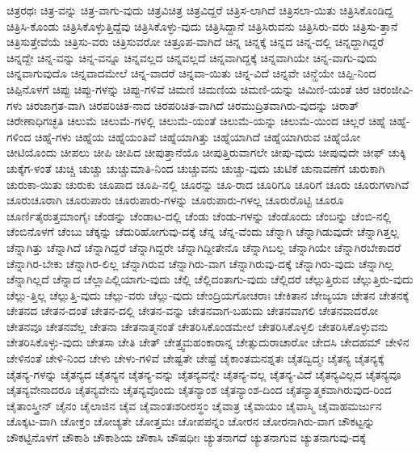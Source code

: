 {ಚಿತ್ರರಥಃ
ಚಿತ್ರ-ವನ್ನು
ಚಿತ್ರ-ವಾಗು-ವುದು
ಚಿತ್ರವಿಚಿತ್ರ
ಚಿತ್ರವಿದ್ದರೆ
ಚಿತ್ರಿಸ-ಲಾಗಿದೆ
ಚಿತ್ರಿಸಲಾ-ಯಿತು
ಚಿತ್ರಿಸಿಕೊಂಡಿದ್ದ
ಚಿತ್ರಿಸಿ-ಕೊಂಡು
ಚಿತ್ರಿಸಿಕೊಳ್ಳುತ್ತಿದ್ದೆವು
ಚಿತ್ರಿಸಿಕೊಳ್ಳು-ವುದು
ಚಿತ್ರಿಸಿದ್ದಾನೆ
ಚಿತ್ರಿಸಿರುವನು
ಚಿತ್ರಿಸಿರು-ವರು
ಚಿತ್ರಿಸು-ತ್ತಾನೆ
ಚಿತ್ರಿಸುತ್ತೇವೆಯೆ
ಚಿತ್ರಿಸು-ವರು
ಚಿತ್ರಿಸುವರೋ
ಚಿತ್ರೂಪ-ವಾಗಿದೆ
ಚಿನ್ನ
ಚಿನ್ನಕ್ಕೆ
ಚಿನ್ನದ
ಚಿನ್ನ-ದಲ್ಲಿ
ಚಿನ್ನದ್ದಾಗಿದ್ದರೆ
ಚಿನ್ನದ್ದೇ
ಚಿನ್ನ-ವನ್ನು
ಚಿನ್ನ-ವನ್ನೂ
ಚಿನ್ನವಲ್ಲದ
ಚಿನ್ನವಲ್ಲದೆ
ಚಿನ್ನವಾಗಿದ್ದಕ್ಕೆ
ಚಿನ್ನವಾಗಿಯೇ
ಚಿನ್ನ-ವಾಗು-ವುದು
ಚಿನ್ನವಾಗುವುದೊ
ಚಿನ್ನವಾದಮೇಲೆ
ಚಿನ್ನ-ವಾದರೆ
ಚಿನ್ನವಾ-ಯಿತು
ಚಿನ್ನ-ವಿದೆ
ಚಿನ್ನವೇ
ಚಿನ್ಹೆಯೇ
ಚಿಪ್ಪಿ-ನಿಂದ
ಚಿಪ್ಪಿನೊಳಗೆ
ಚಿಪ್ಪು
ಚಿಪ್ಪು-ಗಳನ್ನು
ಚಿಪ್ಪು-ಗಳಿವೆ
ಚಿಮಣಿ
ಚಿಮಣಿಯ
ಚಿಮಣಿ-ಯನ್ನು
ಚಿಮಿಣಿ-ಯಂತೆ
ಚಿರ
ಚಿರಂಜೀವಿ-ಗಳು
ಚಿರಜಾಗ್ರತ-ವಾಗಿ
ಚಿರಪರಿಚಿತ-ನಾದ
ಚಿರಪರಿಚಿತ-ವಾಗಿದೆ
ಚಿರಮುದ್ರಿತವಾಗಿರು-ವುದನ್ನು
ಚಿರಾತ್
ಚಿರೇಣಾಧಿಗಚ್ಛತಿ
ಚಿಲುಮೆ
ಚಿಲುಮೆ-ಗಳಲ್ಲಿ
ಚಿಲುಮೆ-ಯಂತೆ
ಚಿಲುಮೆ-ಯನ್ನು
ಚಿಲುಮೆ-ಯಿಂದ
ಚಿಲ್ಲರೆ
ಚಿಹ್ನೆ
ಚಿಹ್ನೆ-ಗಳಿಂದ
ಚಿಹ್ನೆ-ಗಳು
ಚಿಹ್ನೆಯ
ಚಿಹ್ನೆಯಂತಿವೆ
ಚಿಹ್ನೆಯಾಗಿತ್ತು
ಚಿಹ್ನೆಯಾಗಿದೆ
ಚಿಹ್ನೆಯಾಗಿರುವ
ಚಿಹ್ನೆಯೋ
ಚೀಟಿಯೊಂದು
ಚೀಪಲು
ಚೀಪಿ
ಚೀಪಿದ
ಚೀಪುತ್ತಾನೆಯೊ
ಚೀಪುತ್ತಿರುವಾಗಲೇ
ಚೀಪು-ವುದು
ಚೀಪುವುದೇ
ಚೀಫ್
ಚುಕ್ಕಿ
ಚುಕ್ಕೆಗ-ಳಂತೆ
ಚುಚ್ಚಿ
ಚುಚ್ಚು
ಚುಚ್ಚುಮಾತಿ-ನಿಂದ
ಚುಚ್ಚುವನು
ಚುಚ್ಚು-ವುದು
ಚುಟಿಕೆ
ಚುನಾವಣೆಗೆ
ಚುರುಕಾಗಿ
ಚುರುಕಾ-ಯಿತು
ಚುರುಕು
ಚೂಪಾದ
ಚೂಪಿ-ನಲ್ಲಿ
ಚೂರನ್ನು
ಚೂ-ರಾದ
ಚೂರಿಗೂ
ಚೂರಿಗೆ
ಚೂರು
ಚೂರುಗಳಾಗಿವೆ
ಚೂರುಚೂರಾಗಿ
ಚೂರುಪಾರು
ಚೂರುಪಾರು-ಗಳನ್ನು
ಚೂರುಪಾರು-ಗಳಲ್ಲ
ಚೂರುರೊಟ್ಟಿ
ಚೂರೂ
ಚೂರ್ಣಿತೈರುತ್ತಮಾಂಗೈಃ
ಚೆಂಡನ್ನು
ಚೆಂಡಾಟ-ದಲ್ಲಿ
ಚೆಂಡು
ಚೆಂಡು-ಗಳನ್ನು
ಚೆಂಡೊಂದು
ಚೆಂಬನ್ನು
ಚೆಂಬಿ-ನಲ್ಲಿ
ಚೆಂಬಿನೊಳಗೆ
ಚೆಂಬು
ಚೆಕ್ಕನ್ನು
ಚೆದುರಿಹೋಗುವು-ದಕ್ಕೆ
ಚೆನ್ನ
ಚೆನ್ನ-ವೆಂದು
ಚೆನ್ನಾಗಿ
ಚೆನ್ನಾಗಿಡುವುದೇ
ಚೆನ್ನಾಗಿತ್ತಲ್ಲ
ಚೆನ್ನಾಗಿತ್ತು
ಚೆನ್ನಾಗಿದೆ
ಚೆನ್ನಾಗಿದ್ದರೆ
ಚೆನ್ನಾಗಿದ್ದರೇ
ಚೆನ್ನಾಗಿದ್ದೀತೇನೊ
ಚೆನ್ನಾಗಿಬಲ್ಲ
ಚೆನ್ನಾಗಿಯೇ
ಚೆನ್ನಾಗಿರಬೇಕಾದರೆ
ಚೆನ್ನಾಗಿರ-ಬೇಕು
ಚೆನ್ನಾಗಿರ-ಲಿಲ್ಲ
ಚೆನ್ನಾಗಿರುವ
ಚೆನ್ನಾಗಿರು-ವಾಗ
ಚೆನ್ನಾಗಿರುವು-ದಕ್ಕೆ
ಚೆನ್ನಾಗಿರು-ವುದು
ಚೆನ್ನಾಗಿಲ್ಲ
ಚೆನ್ನಾಗಿಲ್ಲದೆ
ಚೆನ್ನಾದ
ಚೆಲ್ಲಾಪಿಲ್ಲಿಯಾಗು-ವುದು
ಚೆಲ್ಲಿ
ಚೆಲ್ಲಿದಂತಾಗು-ವುದು
ಚೆಲ್ಲಿದರೆ
ಚೆಲ್ಲುತ್ತಿರುವ
ಚೆಲ್ಲುತ್ತಿರು-ವುದು
ಚೆಲ್ಲು-ತ್ತಿಲ್ಲ
ಚೆಲ್ಲುತ್ತಿ-ವುದು
ಚೆಲ್ಲು-ವರು
ಚೆಲ್ಲು-ವುದು
ಚೇಂದ್ರಿಯಗೋಚರಾಃ
ಚೇಕಿತಾನ
ಚೇಜ್ಯಯಾ
ಚೇತನ
ಚೇತನಕ್ಕೆ
ಚೇತನದ
ಚೇತನ-ದಂತೆ
ಚೇತನ-ದಲ್ಲಿ
ಚೇತನ-ವನ್ನು
ಚೇತನವಾಗ-ಬಹುದು
ಚೇತನವಾಗಲಿ
ಚೇತನವಾದರೋ
ಚೇತನವೂ
ಚೇತನವೆಲ್ಲ
ಚೇತನಾ
ಚೇತನಾತ್ಮನಂತೆ
ಚೇತರಿಸಿಕೊಂಡಮೇಲೆ
ಚೇತರಿಸಿಕೊಳ್ಳಲಿ
ಚೇತರಿಸಿಕೊಳ್ಳುವನು
ಚೇತರಿಸಿಕೊಳ್ಳು-ವುದು
ಚೇತಸಾ
ಚೇತಿ
ಚೇತ್
ಚೇತ್ತ್ವಮಹಂಕಾರಾನ್ನ
ಚೇತ್ಸುದುರಾಚಾರೋ
ಚೇದಸಿ
ಚೇದಹಮ್
ಚೇಳಿನ
ಚೇಳಿನಂತೆ
ಚೇಳಿ-ನಿಂದ
ಚೇಳು
ಚೇಳು-ಗಳಿವೆ
ಚೇಷ್ಟತೇ
ಚೇಷ್ಟೆ
ಚೈಕಾಂತಮನಶ್ನತಃ
ಚೈತದ್ವಿದ್ಮಃ
ಚೈತನ್ಯ
ಚೈತನ್ಯಕ್ಕೆ
ಚೈತನ್ಯ-ಗಳನ್ನು
ಚೈತನ್ಯದ
ಚೈತನ್ಯನ
ಚೈತನ್ಯ-ವನ್ನು
ಚೈತನ್ಯವನ್ನೇ
ಚೈತನ್ಯ-ವಲ್ಲ
ಚೈತನ್ಯ-ವಿದೆ
ಚೈತನ್ಯವಿಲ್ಲದ
ಚೈತನ್ಯವೂ
ಚೈತನ್ಯವೇನಾದರೂ
ಚೈತನ್ಯವೇನು
ಚೈತನ್ಯವೊಂದು
ಚೈತನ್ಯಾಂಶ
ಚೈತನ್ಯಾಂಶ-ದಿಂದ
ಚೈತನ್ಯಾತ್ಮಕವಾಗಿರುವುದ-ರಿಂದ
ಚೈತಾಂಸ್ತ್ರೀನ್
ಚೈನಂ
ಚೈಲಾಜಿನ
ಚೈವ
ಚೈವಾಂತಃಶರೀರಸ್ಥಂ
ಚೈವಾತ್ರ
ಚೈವಾಯಂ
ಚೈವಾಸ್ಮಿ
ಚೈವಾಹಮರ್ಜುನ
ಚೊಕ್ಕಟ-ವಾಗಿ
ಚೋಕ್ತಂ
ಚೋಚ್ಯತೇ
ಚೋತ್ತಮಃ
ಚೋಪಪನ್ನಂ
ಚೋರನ
ಚೋರನಾಗಿರು-ವಾಗ
ಚೌಕಟ್ಟನ್ನು
ಚೌಕಟ್ಟಿನೊಳಗೆ
ಚೌಕಾಶಿ
ಚೌಕಾಶಿಯ
ಚೌಕಾಸಿ
ಚೌಷಧೀಃ
ಚ್ಯುತನಾಗದೆ
ಚ್ಯುತನಾಗುವ
ಚ್ಯುತನಾಗುವು-ದಕ್ಕೆ
}
